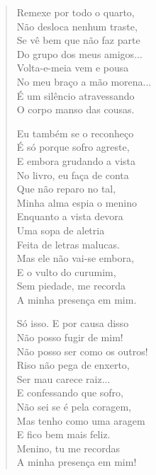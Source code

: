 \begin{verse}
Remexe por todo o quarto,\\
Não desloca nenhum traste,\\
Se vê bem que não faz parte\\
Do grupo dos meus amigos...\\
Volta-e-meia vem e pousa\\
No meu braço a mão morena...\\
É um silêncio atravessando\\
O corpo manso das cousas.

Eu também se o reconheço\\
É só porque sofro agreste,\\
E embora grudando a vista\\
No livro, eu faça de conta\\
Que não reparo no tal,\\
Minha alma espia o menino\\
Enquanto a vista devora\\
Uma sopa de aletria\\
Feita de letras malucas.\\
Mas ele não vai-se embora,\\
E o vulto do curumim,\\
Sem piedade, me recorda\\
A minha presença em mim.

Só isso. E por causa disso\\
Não posso fugir de mim!\\
Não posso ser como os outros!\\
Riso não pega de enxerto,\\
Ser mau carece raiz...\\
E confessando que sofro,\\
Não sei se é pela coragem,\\
Mas tenho como uma aragem\\
E fico bem mais feliz.\\
Menino, tu me recordas\\
A minha presença em mim!


\end{verse}
